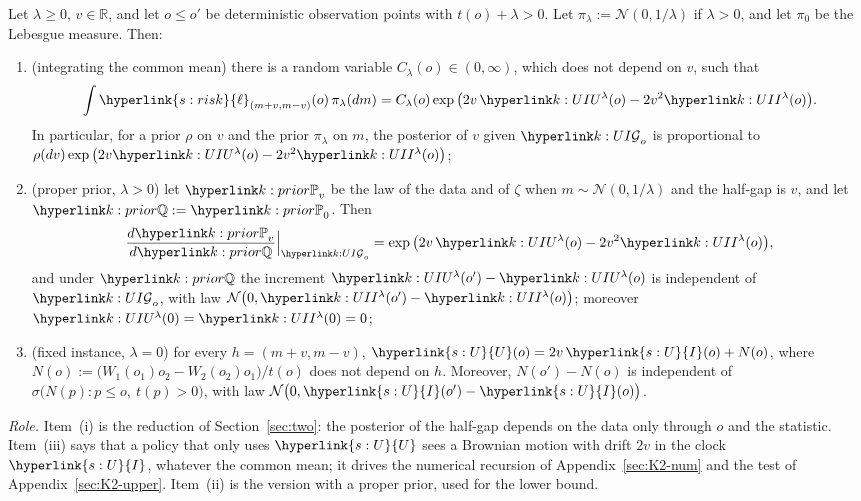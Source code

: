 \documentclass[11pt]{article}
\newcommand{\dt}[1]{\hypertarget{#1}{}}
\DeclareRobustCommand{\sy}[2]{{\hyperlink{#1}{#2}}}
\newcommand{\R}{\mathbb{R}}
\newcommand{\1}{\mathbf{1}}
\newcommand{\lh}{\sy{s:risk}{\ell}}
\newcommand{\Ud}{\sy{s:U}{U}}
\newcommand{\Id}{\sy{s:U}{I}}
\begin{document}
\begin{lemma}\label{lem:K2-gauss}
Let $\lambda\ge0$, $v\in\R$, and let $o\le o'$ be deterministic observation points with $t(o)+\lambda>0$. Let $\pi_\lambda:=\mathcal N(0,1/\lambda)$ if $\lambda>0$,
and let $\pi_0$ be the Lebesgue measure. Then:
\begin{enumerate}
\item[(i)] (integrating the common mean) there is a random variable $C_\lambda(o)\in(0,\infty)$, which does not depend on $v$, such that
\[
\int\lh_{(m+v,m-v)}(o)\,\pi_\lambda(dm)=C_\lambda(o)\exp\big(2v\,\kU(o)-2v^2\kI(o)\big).
\]
In particular, for a prior $\rho$ on $v$ and the prior $\pi_\lambda$ on $m$, the posterior of $v$ given $\kF_o$ is proportional to $\rho(dv)\exp\big(2v\kU(o)-2v^2\kI(o)\big)$;
\item[(ii)] (proper prior, $\lambda>0$)\dt{k:prior} let $\kP{v}$ be the law of the data and of $\zeta$ when $m\sim\mathcal N(0,1/\lambda)$ and the half-gap is $v$, and let
$\kQ:=\kP{0}$. Then
\[
\frac{d\kP{v}}{d\kQ}\Big|_{\kF_o}=\exp\big(2v\,\kU(o)-2v^2\kI(o)\big),
\]
and under $\kQ$ the increment $\kU(o')-\kU(o)$ is independent of $\kF_o$, with law $\mathcal N\big(0,\kI(o')-\kI(o)\big)$; moreover $\kU(0)=\kI(0)=0$;
\item[(iii)] (fixed instance, $\lambda=0$) for every $h=(m+v,m-v)$, $\Ud(o)=2v\,\Id(o)+N(o)$, where $N(o):=\big(W_1(o_1)o_2-W_2(o_2)o_1\big)/t(o)$ does not depend on $h$.
Moreover, $N(o')-N(o)$ is independent of $\sigma\big(N(p):p\le o,\ t(p)>0\big)$, with law $\mathcal N\big(0,\Id(o')-\Id(o)\big)$.
\end{enumerate}
\end{lemma}
\noindent\textit{Role.} Item~(i) is the reduction of Section~\ref{sec:two}: the posterior of the half-gap depends on the data only through $o$ and the
statistic. Item~(iii) says that a policy that only uses $\Ud$ sees a Brownian motion with drift $2v$ in the clock $\Id$, whatever the common mean; it drives
the numerical recursion of Appendix~\ref{sec:K2-num} and the test of Appendix~\ref{sec:K2-upper}. Item~(ii) is the version with a proper prior, used for the
lower bound.
\end{document}
